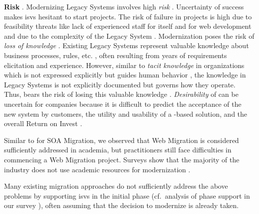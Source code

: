 \textbf{Risk} \autocite[cf.][def. 3.3512]{ISO/IEEE24765Vocabulary}. Modernizing \glspl{Legacy System} involves high \emph{risk} \autocite{Heil2018ReWaMP,Khadka2014ProfessionalsModernization,Canfora2000Decomposing,Bisbal1999LegacyInformationSystems,Seacord2003ModernizingLS}.
Uncertainty of success makes \glspl{isv} hesitant to start projects.
The risk of failure in  projects is high \autocite{Gartner2014ModernizationFailure,ForresterResearch2011Modernization} due to feasibility threats like lack of experienced staff for  itself \autocite{Sneed2010SoftwareMigration,Seacord2003ModernizingLS} and for \Gls{web} development and due to the complexity of the \gls{Legacy System} \autocite{Khadka2014ProfessionalsModernization}.
Modernization poses the risk of \emph{loss of knowledge} \autocite{Khadka2014ProfessionalsModernization}.
Existing \glspl{Legacy System} represent valuable knowledge about business processes, rules, etc.
\autocite{Aversano2001,Sneed2010SoftwareMigration,Wagner2014}, often resulting from years of requirements elicitation and experience.
However, similar to \emph{tacit knowledge} in organizations which is not expressed explicitly but guides human behavior \autocite{Nonaka2008TacitKnowledge}, the knowledge in \glspl{Legacy System} is not explicitly documented but governs how they operate.
Thus,  bears the risk of losing this valuable knowledge \autocite{Khadka2014ProfessionalsModernization}.
\emph{Desirability} of  can be uncertain for companies because it is difficult to predict the acceptance of the new system by customers, the utility and usability of a -based solution, and the overall Return on Invest \autocite{Khadka2014ProfessionalsModernization}.

Similar to \citet{Razavian2013PHD} for SOA Migration, we observed that \gls{Web Migration} is considered sufficiently addressed in academia, but practitioners still face difficulties in commencing a \gls{Web Migration} project.
Surveys show that the majority of the industry does not use academic resources for modernization \autocite{Batlajery2014IndustrialSurveyModernization}.

Many existing migration approaches do not sufficiently address the above problems by supporting \glspl{isv} in the initial phase (cf.~analysis of phase support in our survey \autocite{Heil2017Survey}), often assuming that the decision to modernize is already taken.

